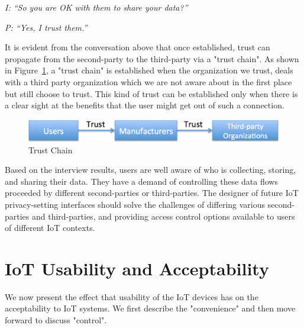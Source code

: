 \textit{I: ``So you are OK with them to share your data?''\\}

\textit{P: ``Yes, I trust them.''\\}

It is evident from the conversation above that once established, trust can propagate from the second-party to the third-party via a "trust chain". As shown in Figure~\ref{fig:trustchain}, a "trust chain" is established when the organization we trust, deals with a third party organization which we are not aware about in the first place but still choose to trust. This kind of trust can be established only when there is a clear sight at the benefits that the user might get out of such a connection.

\begin{figure}
	\centering
	\includegraphics[width=0.75\columnwidth]{figures/trustchain.pdf}
	\caption{Trust Chain}
	\label{fig:trustchain}
\end{figure}

Based on the interview results, users are well aware of who is collecting, storing, and sharing their data. They have a demand of controlling these data flows proceeded by different second-parties or third-parties. The designer of future IoT privacy-setting interfaces should solve the challenges of differing various second-parties and third-parties, and providing access control options available to users of different IoT contexts.

\section{IoT Usability and Acceptability}
We now present the effect that usability of the IoT devices has on the acceptability to IoT systems. We first describe the "convenience" and then move forward to discuss "control".

